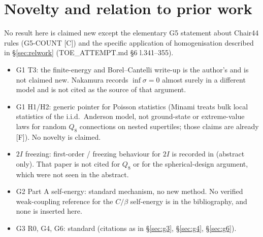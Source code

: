 \documentclass[11pt]{article}
\begin{document}
\section{Novelty and relation to prior work}\label{sec:novelty}
No result here is claimed new except the elementary G5 statement about Chair44 rules (G5-COUNT [C]) and the specific application of homogenisation described in \S\ref{sec:relwork} (TOE\_ATTEMPT.md \S6 l.341--355).
\begin{itemize}\small
\item G1 T3: the finite-energy and Borel--Cantelli write-up is the author's and is not claimed new. Nakamura records $\inf\sigma=0$ almost surely in a different model \cite{nakamura2000lifshitz} and is not cited as the source of that argument.
\item G1 H1/H2: generic pointer for Poisson statistics \cite{minami1996local} (Minami treats bulk local statistics of the i.i.d.\ Anderson model, not ground-state or extreme-value laws for random $Q_8$ connections on nested supertiles; those claims are already [F]). No novelty is claimed.
\item $2I$ freezing: first-order / freezing behaviour for $2I$ is recorded in \cite{petcher1980montecarlo} (abstract only). That paper is not cited for $Q_8$ or for the spherical-design argument, which were not seen in the abstract.
\item G2 Part A self-energy: standard mechanism, no new method. No verified weak-coupling reference for the $C/\beta$ self-energy is in the bibliography, and none is inserted here.
\item G3 R0, G4, G6: standard (citations as in \S\ref{sec:g3}, \S\ref{sec:g4}, \S\ref{sec:g6}).
\end{itemize}
\end{document}
